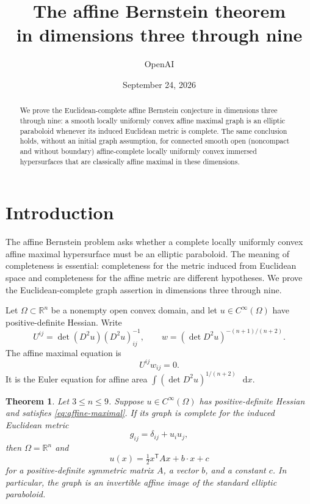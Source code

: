 \documentclass[11pt]{amsart}
\title[The affine Bernstein theorem]{The affine Bernstein theorem\\
in dimensions three through nine}
\author{OpenAI}
\date{September 24, 2026}
\newcommand{\R}{\mathbb R}
\newcommand{\dd}{\mathop{}\!\mathrm d}
\newtheorem{theorem}{Theorem}[section]
\theoremstyle{definition}
\theoremstyle{remark}
\numberwithin{equation}{section}
\begin{document}
\begin{abstract}
We prove the Euclidean-complete affine Bernstein conjecture in dimensions
three through nine: a smooth locally uniformly convex affine maximal graph
is an elliptic paraboloid whenever its induced Euclidean metric is complete.
The same conclusion holds, without an initial graph assumption, for connected
smooth open (noncompact and without boundary) affine-complete locally uniformly
convex immersed hypersurfaces that are classically affine maximal in these
dimensions.
\end{abstract}

\maketitle

\section{Introduction}

The affine Bernstein problem asks whether a complete locally uniformly
convex affine maximal hypersurface must be an elliptic paraboloid.
The meaning of completeness is essential: completeness for the metric
induced from Euclidean space and completeness for the affine metric
are different hypotheses. We prove the Euclidean-complete graph
assertion in dimensions three through nine.

Let \(\Omega\subset\R^n\) be a nonempty open convex domain, and let
\(u\in C^\infty(\Omega)\) have positive-definite Hessian. Write
\[
 U^{ij}=\det(D^2u)(D^2u)^{-1}_{ij},
 \qquad
 w=(\det D^2u)^{-(n+1)/(n+2)}.
\]
The affine maximal equation is
\begin{equation}\label{eq:affine-maximal}
 U^{ij}w_{ij}=0.
\end{equation}
It is the Euler equation for affine area
\(\int(\det D^2u)^{1/(n+2)}\,\dd x\).

\begin{theorem}\label{thm:main}
Let \(3\le n\le9\). Suppose \(u\in C^\infty(\Omega)\) has
positive-definite Hessian and satisfies \eqref{eq:affine-maximal}.
If its graph is complete for the induced Euclidean metric
\[
 g_{ij}=\delta_{ij}+u_i u_j,
\]
then \(\Omega=\R^n\) and
\[
 u(x)=\tfrac12 x^{\mathsf T}Ax+b\cdot x+c
\]
for a positive-definite symmetric matrix \(A\), a vector \(b\), and a
constant \(c\). In particular, the graph is an invertible affine image
of the standard elliptic paraboloid.
\end{theorem}
\end{document}
